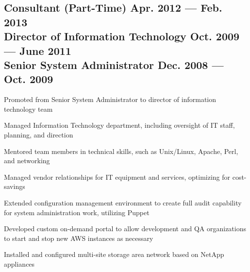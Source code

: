\documentclass[letter,10pt]{article}
\begin{document}
\subsection{Consultant (Part-Time) \hfill \textrm{\textmd{Apr. 2012 --- Feb. 2013}}\\
	Director of Information Technology \hfill \textrm{\textmd{Oct. 2009 --- June 2011}}\\
	Senior System Administrator \hfill \textrm{\textmd{Dec. 2008 --- Oct. 2009}}}
\begin{zitemize}
	\item Promoted from Senior System Administrator to director of
	information technology team
	\item Managed Information Technology department, including
	oversight of IT staff, planning, and direction
	\item Mentored team members in technical skills, such as
	Unix/Linux, Apache, Perl, and networking
	\item Managed vendor relationships for IT equipment and
	services, optimizing for cost-savings
	\item Extended configuration management environment to create
	full audit capability for system administration work,
	utilizing Puppet
	\item Developed custom on-demand portal to allow development and
	QA organizations to start and stop new AWS instances as
	necessary
	\item Installed and configured multi-site storage area network
	based on NetApp appliances
\end{zitemize}

\end{document}
